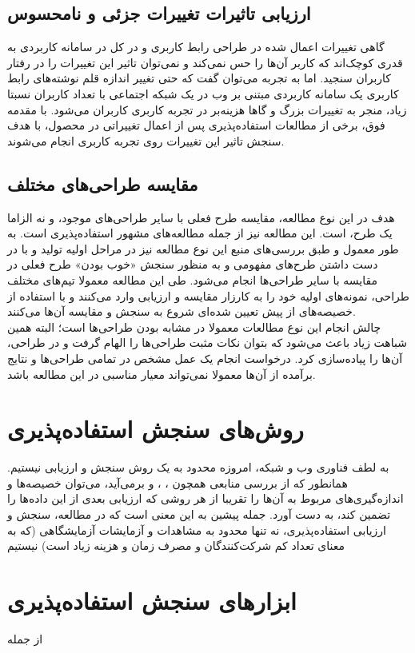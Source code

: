 \subsection{ارزیابی تاثیرات تغییرات جزئی و نامحسوس}
گاهی تغییرات اعمال شده در طراحی رابط  کاربری و در کل در سامانه کاربردی به قدری کوچک‌اند که کاربر آن‌ها را حس نمی‌کند و نمی‌توان تاثیر این تغییرات را در رفتار کاربران سنجید. اما به تجربه
\cite{albert_measuring_2013}
می‌توان گفت که حتی تغییر اندازه قلم نوشته‌های رابط کاربری یک سامانه کاربردی مبتنی بر وب در یک شبکه اجتماعی با تعداد کاربران نسبتا زیاد، منجر به تغییرات  بزرگ و گاها هزینه‌بر در تجربه کاربری کاربران می‌شود. با مقدمه فوق، برخی از مطالعات استفاده‌پذیری پس از اعمال تغییراتی در محصول، با هدف سنجش تاثیر این تغییرات روی تجربه کاربری انجام می‌شوند.
\subsection{مقایسه طراحی‌های مختلف}
هدف در این نوع مطالعه، مقایسه طرح فعلی با سایر طراحی‌های موجود، و نه الزاما یک طرح، است. این مطالعه نیز از جمله مطالعه‌های مشهور استفاده‌پذیری است. به طور معمول و طبق بررسی‌های منبع
\cite{albert_measuring_2013}
این نوع مطالعه نیز در مراحل اولیه تولید و با در دست داشتن طرح‌های مفهومی و به منظور سنجش «خوب بودن» طرح فعلی در مقایسه با سایر طراحی‌ها انجام می‌شود. طی این مطالعه معمولا تیم‌های مختلف طراحی، نمونه‌های اولیه
خود را به کارزار مقایسه و ارزیابی وارد می‌کنند و با استفاده از خصیصه‌های از پیش تعیین شده‌ای شروع به سنجش و مقایسه آن‌ها می‌کنند.\\
چالش انجام این نوع مطالعات معمولا در مشابه بودن طراحی‌ها است؛ البته همین شباهت زیاد باعث می‌شود که بتوان نکات مثبت طراحی‌ها را الهام گرفت و در طراحی، آن‌ها را پیاده‌سازی کرد. درخواست انجام یک عمل مشخص در تمامی طراحی‌ها و نتایج برآمده از آن‌ها معمولا نمی‌تواند معیار مناسبی در این مطالعه باشد.
\section{روش‌های سنجش استفاده‌پذیری}
به لطف فناوری وب و شبکه، امروزه محدود به یک روش سنجش و ارزیابی نیستیم. همانطور که از بررسی منابعی همچون
\cite{agarwal_assessing_2002}،
\cite{albert_measuring_2013}،
\cite{krug_dont_2018} و
\cite{noauthor_measuringu:_2018}
برمی‌آید، می‌توان خصیصه‌ها و اندازه‌گیری‌های مربوط به آن‌ها را تقریبا از هر روشی که ارزیابی بعدی از این داده‌ها را تضمین کند، به دست آورد. جمله پیشین به این معنی است که در مطالعه، سنجش و ارزیابی استفاده‌پذیری، نه تنها محدود به مشاهدات و آزمایشات آزمایشگاهی
(که به معنای تعداد کم شرکت‌کنندگان و مصرف زمان و هزینه زیاد است)
نیستیم
\section{ابزارهای سنجش استفاده‌پذیری}
از جمله 





